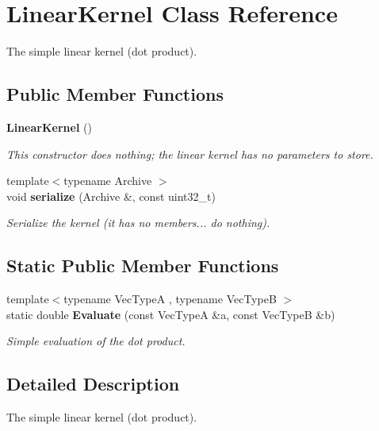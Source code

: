 \section{Linear\+Kernel Class Reference}
\label{classmlpack_1_1kernel_1_1LinearKernel}


The simple linear kernel (dot product).  


\subsection*{Public Member Functions}
\begin{DoxyCompactItemize}
\item 
\textbf{ Linear\+Kernel} ()
\begin{DoxyCompactList}\small\item\em This constructor does nothing; the linear kernel has no parameters to store. \end{DoxyCompactList}\item 
{\footnotesize template$<$typename Archive $>$ }\\void \textbf{ serialize} (Archive \&, const uint32\+\_\+t)
\begin{DoxyCompactList}\small\item\em Serialize the kernel (it has no members... do nothing). \end{DoxyCompactList}\end{DoxyCompactItemize}
\subsection*{Static Public Member Functions}
\begin{DoxyCompactItemize}
\item 
{\footnotesize template$<$typename Vec\+TypeA , typename Vec\+TypeB $>$ }\\static double \textbf{ Evaluate} (const Vec\+TypeA \&a, const Vec\+TypeB \&b)
\begin{DoxyCompactList}\small\item\em Simple evaluation of the dot product. \end{DoxyCompactList}\end{DoxyCompactItemize}


\subsection{Detailed Description}
The simple linear kernel (dot product). 

